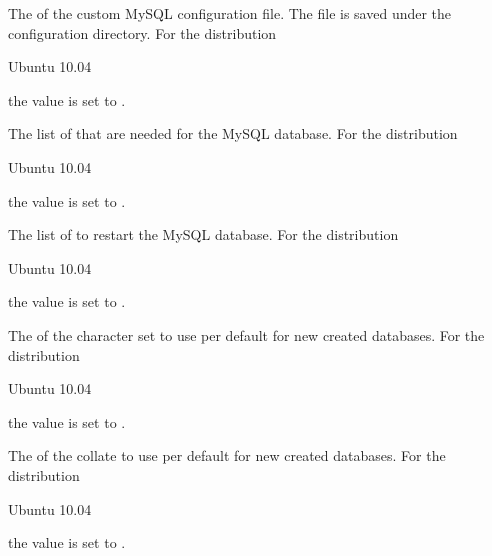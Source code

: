 The  of the custom MySQL configuration file. The file is saved
under the configuration directory.
For the distribution
\begin{inparaitem}
\item[\TheDistribution{ubuntu}] Ubuntu 10.04
\end{inparaitem}
the value is set to .


The list of  that are needed for the MySQL database. 
For the distribution
\begin{inparaitem}
\item[\TheDistribution{ubuntu}] Ubuntu 10.04
\end{inparaitem}
the value is set to .


The list of  to restart the MySQL database.
For the distribution
\begin{inparaitem}
\item[\TheDistribution{ubuntu}] Ubuntu 10.04
\end{inparaitem}
the value is set to .


The  of the character set to use per default for new created databases.
For the distribution
\begin{inparaitem}
\item[\TheDistribution{ubuntu}] Ubuntu 10.04
\end{inparaitem}
the value is set to .


The  of the collate to use per default for new created databases.
For the distribution
\begin{inparaitem}
\item[\TheDistribution{ubuntu}] Ubuntu 10.04
\end{inparaitem}
the value is set to .
 
